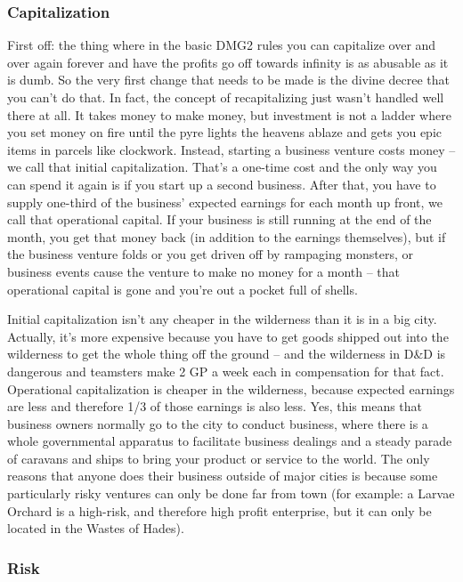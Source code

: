 \subsubsection{Capitalization}

First off: the thing where in the basic DMG2 rules you can capitalize over and over again forever and have the profits go off towards infinity is as abusable as it is dumb. So the very first change that needs to be made is the divine decree that you can't do that. In fact, the concept of recapitalizing just wasn't handled well there at all. It takes money to make money, but investment is not a ladder where you set money on fire until the pyre lights the heavens ablaze and gets you epic items in parcels like clockwork. Instead, starting a business venture costs money -- we call that initial capitalization. That's a one-time cost and the only way you can spend it again is if you start up a second business. After that, you have to supply one-third of the business' expected earnings for each month up front, we call that operational capital. If your business is still running at the end of the month, you get that money back (in addition to the earnings themselves), but if the business venture folds or you get driven off by rampaging monsters, or business events cause the venture to make no money for a month -- that operational capital is gone and you're out a pocket full of shells.

Initial capitalization isn't any cheaper in the wilderness than it is in a big city. Actually, it's more expensive because you have to get goods shipped out into the wilderness to get the whole thing off the ground -- and the wilderness in D\&D is dangerous and teamsters make 2 GP a week each in compensation for that fact. Operational capitalization is cheaper in the wilderness, because expected earnings are less and therefore 1/3 of those earnings is also less. Yes, this means that business owners normally go to the city to conduct business, where there is a whole governmental apparatus to facilitate business dealings and a steady parade of caravans and ships to bring your product or service to the world. The only reasons that anyone does their business outside of major cities is because some particularly risky ventures can only be done far from town (for example: a Larvae Orchard is a high-risk, and therefore high profit enterprise, but it can only be located in the Wastes of Hades).

\subsubsection{Risk}

